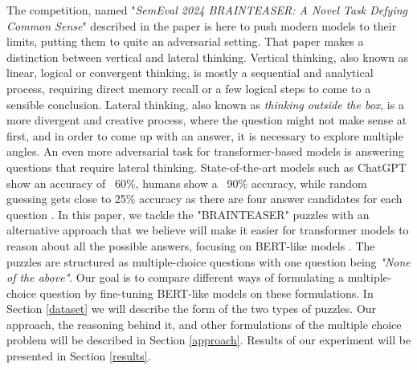 The competition, named "\textit{SemEval 2024 BRAINTEASER: A Novel Task Defying Common Sense}" described in the paper \citep{semeval} is here to push modern models to their limits, putting
them to quite an adversarial setting.
That paper makes a distinction between vertical and lateral thinking.
Vertical thinking, also known as linear, logical or convergent thinking, is mostly a sequential and analytical process, requiring direct memory recall or a few logical steps to come to a sensible conclusion.
Lateral thinking, also known as \textit{thinking outside the box}, is a more divergent and creative process, where the question might not make sense at first, and in order to come up with an answer, it is necessary to explore multiple angles.
An even more adversarial task for transformer-based models is answering questions that require lateral thinking. State-of-the-art models such as ChatGPT show an accuracy of ~60\%, humans show a ~90\% accuracy, while random guessing gets close to 25\% accuracy as there are four answer candidates for each question \citep{semeval}.
In this paper, we tackle the "BRAINTEASER" puzzles with an alternative approach that we believe will make it easier for transformer models to reason about all the possible answers, focusing on BERT-like models \cite{devlin}.
The puzzles are structured as multiple-choice questions with one question being \emph{"None of the above"}.
Our goal is to compare different ways of formulating a multiple-choice question by fine-tuning BERT-like models on these formulations.
In Section \ref{dataset} we will describe the form of the two types of puzzles. 
Our approach, the reasoning behind it, and other formulations of the multiple choice problem will be described in Section \ref{approach}.
Results of our experiment will be presented in Section \ref{results}.